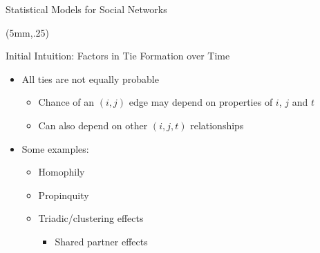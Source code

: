 \documentclass[10pt]{beamer}
\begin{document}
\begin{frame}{Statistical Models for Social Networks}
{\begin{textblock*}{60mm}(5mm,.25\textheight)
\begin{block}{Initial Intuition: Factors in Tie Formation over Time}
\begin{itemize}
\item All ties are not equally probable 
\begin{itemize}
\item Chance of an $(i,j)$ edge may depend on properties of $i$, $j$ and $t$
\item Can also depend on other $(i,j,t)$ relationships
\end{itemize}
\item Some examples:
\begin{itemize}
\item Homophily
\item Propinquity
\item Triadic/clustering effects
\begin{itemize}
\item Shared partner effects
\end{itemize}
\end{itemize}
\end{itemize}
\end{block}
\end{textblock*}
}


\end{frame}
\end{document}
